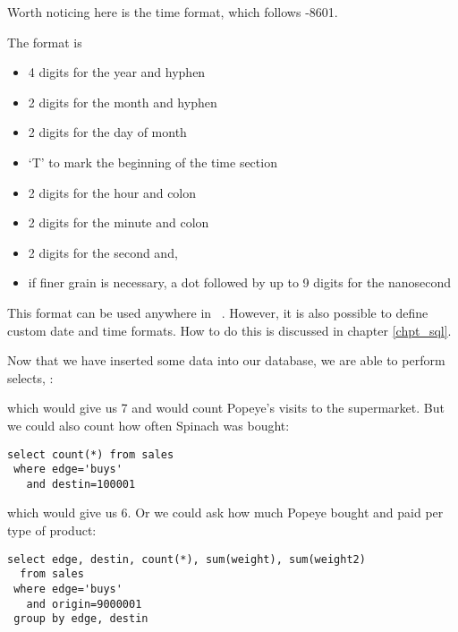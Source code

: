 Worth noticing here is the time format,
which follows -8601.

The format is
\begin{itemize}
\item 4 digits for the year and hyphen
\item 2 digits for the month and hyphen
\item 2 digits for the day of month
\item `T' to mark the beginning of the time section
\item 2 digits for the hour and colon
\item 2 digits for the minute and colon
\item 2 digits for the second and,
\item if finer grain is necessary,
a dot followed by up to 9 digits
for the nanosecond
\end{itemize}

This format can be used anywhere in \nowdb\ \sql.
However, it is also possible to define custom
date and time formats. How to do this is discussed
in chapter \ref{chpt_sql}.

Now that we have inserted some data
into our database, we are able to perform selects, \eg:


which would give us 7 and would count Popeye's visits to the supermarket.
But we could also count how often Spinach was bought:

\begin{sqlcode}
\begin{lstlisting}
select count(*) from sales
 where edge='buys'
   and destin=100001
\end{lstlisting}
\end{sqlcode}

which would give us 6.
Or we could ask how much Popeye bought and paid per type of product:

\begin{sqlcode}
\begin{lstlisting}
select edge, destin, count(*), sum(weight), sum(weight2)
  from sales 
 where edge='buys' 
   and origin=9000001 
 group by edge, destin
\end{lstlisting}
\end{sqlcode}

